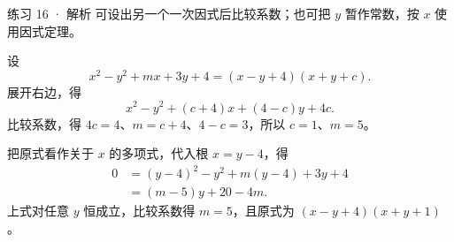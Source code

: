 
\begin{solution}[before skip=4pt plus 1pt,after skip=4pt plus 1pt,top=6pt,bottom=6pt]{练习 16 · 解析}
\think 可设出另一个一次因式后比较系数；也可把 $y$ 暂作常数，按 $x$ 使用因式定理。

设
\[x^2-y^2+mx+3y+4=(x-y+4)(x+y+c).\]
展开右边，得
\[x^2-y^2+(c+4)x+(4-c)y+4c.\]
比较系数，得 $4c=4$、$m=c+4$、$4-c=3$，所以 $c=1$、$m=5$。

把原式看作关于 $x$ 的多项式，代入根 $x=y-4$，得
\begin{align*}
0&=(y-4)^2-y^2+m(y-4)+3y+4\\
&=(m-5)y+20-4m.
\end{align*}
上式对任意 $y$ 恒成立，比较系数得 $m=5$，且原式为 $(x-y+4)(x+y+1)$。

\end{solution}
